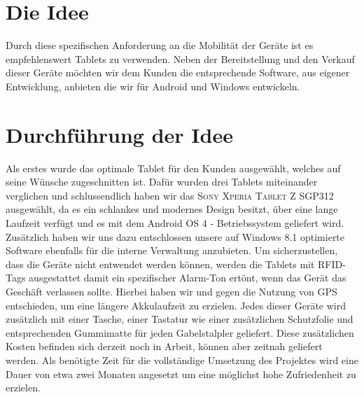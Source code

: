 \documentclass{article}
\begin{document}
\section{Die Idee}
Durch diese spezifischen Anforderung an die Mobilität der Geräte ist es empfehlenswert Tablets zu verwenden. Neben der Bereitstellung und den Verkauf dieser Geräte möchten wir dem Kunden die entsprechende Software, aus eigener Entwicklung, anbieten die wir für Android und Windows entwickeln.

\section{Durchführung der Idee}
Als erstes wurde das optimale Tablet für den Kunden ausgewählt, welches auf seine Wünsche zugeschnitten ist. Dafür wurden drei Tablets miteinander verglichen und schlussendlich haben wir das \textsc{Sony Xperia Tablet Z SGP312} ausgewählt, da es ein schlankes und modernes Design besitzt, über eine lange Laufzeit verfügt und es mit dem Android OS 4 - Betriebssystem geliefert wird. Zusätzlich haben wir uns dazu entschlossen unsere auf Windows 8.1 optimierte Software ebenfalls für die interne Verwaltung anzubieten. Um sicherzustellen, dass die Geräte nicht entwendet werden können, werden die Tablets mit RFID-Tags ausgestattet damit ein spezifischer Alarm-Ton ertönt, wenn das Gerät das Geschäft verlassen sollte. Hierbei haben wir und gegen die Nutzung von GPS entschieden, um eine längere Akkulaufzeit zu erzielen. Jedes dieser Geräte wird zusätzlich mit einer Tasche, einer Tastatur wie einer zusätzlichen Schutzfolie und entsprechenden Gummimatte für jeden Gabelstalpler geliefert. Diese zusätzlichen Kosten befinden sich derzeit noch in Arbeit, können aber zeitnah geliefert werden. 
\newline 
Als benötigte Zeit für die vollständige Umsetzung des Projektes wird eine Dauer von etwa zwei Monaten angesetzt um eine möglichst hohe Zufriedenheit zu erzielen.\newline
\end{document}
